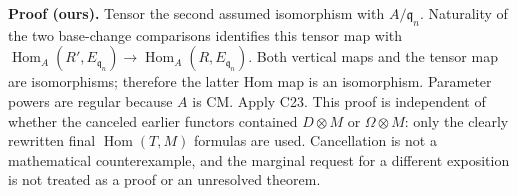 \documentclass[11pt]{article}
\newcommand{\Hom}{\operatorname{Hom}}
\begin{document}
\textbf{Proof (ours).} Tensor the second assumed isomorphism with
$A/\mathfrak q_n$. Naturality of the two base-change comparisons
identifies this tensor map with
$\Hom_A(R',E_{\mathfrak q_n})\to\Hom_A(R,E_{\mathfrak q_n})$.
Both vertical maps and the tensor map are isomorphisms; therefore
the latter Hom map is an isomorphism. Parameter powers are regular
because $A$ is CM. Apply C23. This proof is independent of whether
the canceled earlier functors contained $D\otimes M$ or
$\Omega\otimes M$: only the clearly rewritten final $\Hom(T,M)$
formulas are used. Cancellation is not a mathematical counterexample,
and the marginal request for a different exposition is not treated
as a proof or an unresolved theorem.


\nocite{EGAIV2,BourbakiHistorical}

\end{document}
